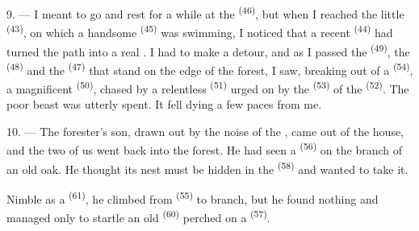 \VUsaut{3.0mm}
\VUsaut{3.0mm}

9. --- I meant to go and rest for a while at the 
\textsuperscript{(46)}, but when I reached the little  \textsuperscript{(43)}, on
which a handsome  \textsuperscript{(45)} was swimming, I noticed that a recent
 \textsuperscript{(44)} had turned the path into a real
. I had to make a detour, and as I passed the 
\textsuperscript{(49)}, the  \textsuperscript{(48)} and the 
\textsuperscript{(47)} that stand on the edge of the forest, I saw, breaking out of a
 \textsuperscript{(54)}, a magnificent 
\textsuperscript{(50)}, chased by a relentless  \textsuperscript{(51)}
urged on by the  \textsuperscript{(53)} of the 
\textsuperscript{(52)}. The poor beast was utterly spent. It fell dying a few paces from me.

10. --- The forester's son, drawn out by the noise of the , came out of the
house, and the two of us went back into the forest. He had seen a 
\textsuperscript{(56)} on the branch of an old oak. He thought its nest must be hidden in the
 \textsuperscript{(58)} and wanted to take it.

Nimble as a  \textsuperscript{(61)}, he climbed from 
\textsuperscript{(55)} to branch, but he found nothing and managed only to startle an old
 \textsuperscript{(60)} perched on a  \textsuperscript{(57)}.
\VUsaut{4.0mm}
\VUfilet{22mm}
